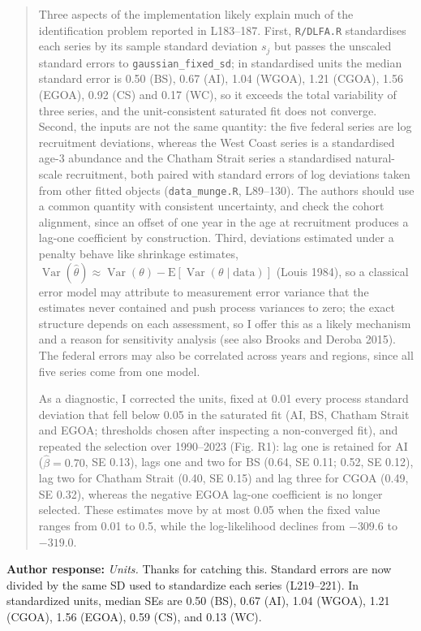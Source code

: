 \documentclass[11pt]{article}
\begin{document}
\begin{quote}
Three aspects of the implementation likely explain much of the
identification problem reported in L183--187. First, \texttt{R/DLFA.R}
standardises each series by its sample standard deviation \(s_j\) but
passes the unscaled standard errors to \texttt{gaussian\_fixed\_sd}; in
standardised units the median standard error is 0.50 (BS), 0.67 (AI),
1.04 (WGOA), 1.21 (CGOA), 1.56 (EGOA), 0.92 (CS) and 0.17 (WC), so it
exceeds the total variability of three series, and the unit-consistent
saturated fit does not converge. Second, the inputs are not the same
quantity: the five federal series are log recruitment deviations,
whereas the West Coast series is a standardised age-3 abundance and the
Chatham Strait series a standardised natural-scale recruitment, both
paired with standard errors of log deviations taken from other fitted
objects (\texttt{data\_munge.R}, L89--130). The authors should use a
common quantity with consistent uncertainty, and check the cohort
alignment, since an offset of one year in the age at recruitment
produces a lag-one coefficient by construction. Third, deviations
estimated under a penalty behave like shrinkage estimates,
\(\operatorname{Var}(\hat\theta) \approx \operatorname{Var}(\theta) - \mathrm{E}[\operatorname{Var}(\theta \mid \text{data})]\)
(Louis 1984), so a classical error model may attribute to measurement
error variance that the estimates never contained and push process
variances to zero; the exact structure depends on each assessment, so I
offer this as a likely mechanism and a reason for sensitivity analysis
(see also Brooks and Deroba 2015). The federal errors may also be
correlated across years and regions, since all five series come from one
model.

As a diagnostic, I corrected the units, fixed at 0.01 every process
standard deviation that fell below 0.05 in the saturated fit (AI, BS,
Chatham Strait and EGOA; thresholds chosen after inspecting a
non-converged fit), and repeated the selection over 1990--2023 (Fig.
R1): lag one is retained for AI (\(\hat\beta = 0.70\), SE 0.13), lags
one and two for BS (0.64, SE 0.11; 0.52, SE 0.12), lag two for Chatham
Strait (0.40, SE 0.15) and lag three for CGOA (0.49, SE 0.32), whereas
the negative EGOA lag-one coefficient is no longer selected. These
estimates move by at most 0.05 when the fixed value ranges from 0.01 to
0.5, while the log-likelihood declines from \(-309.6\) to \(-319.0\).
\end{quote}

\textbf{Author response:} \emph{Units.} Thanks for catching this.
Standard errors are now divided by the same SD used to standardize each
series (L219--221). In standardized units, median SEs are 0.50 (BS),
0.67 (AI), 1.04 (WGOA), 1.21 (CGOA), 1.56 (EGOA), 0.59 (CS), and 0.13
(WC).
\end{document}
